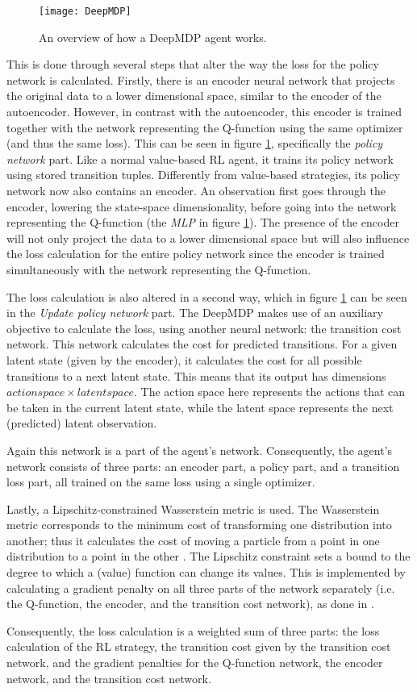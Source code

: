 \begin{figure}[h]
    \centering
    \texttt{[image: DeepMDP]}
    \caption{An overview of how a DeepMDP agent works.}
    \label{fig:deepmdp_agent}
\end{figure}

This is done through several steps that alter the way the loss for the policy network is calculated. Firstly, there is an encoder neural network that projects the original data to a lower dimensional space, similar to the encoder of the autoencoder. However, in contrast with the autoencoder, this encoder is trained together with the network representing the Q-function using the same optimizer (and thus the same loss). This can be seen in figure \ref{fig:deepmdp_agent}, specifically the \textit{policy network} part. Like a normal value-based RL agent, it trains its policy network using stored transition tuples. Differently from value-based strategies, its policy network now also contains an encoder. An observation first goes through the encoder, lowering the state-space dimensionality, before going into the network representing the Q-function (the \textit{MLP} in figure \ref{fig:deepmdp_agent}). The presence of the encoder will not only project the data to a lower dimensional space but will also influence the loss calculation for the entire policy network since the encoder is trained simultaneously with the network representing the Q-function. 

The loss calculation is also altered in a second way, which in figure \ref{fig:deepmdp_agent} can be seen in the \textit{Update policy network} part. The DeepMDP makes use of an auxiliary objective to calculate the loss, using another neural network: the transition cost network. This network calculates the cost for predicted transitions. For a given latent state (given by the encoder), it calculates the cost for all possible transitions to a next latent state. This means that its output has dimensions $action space \times latent space$. The action space here represents the actions that can be taken in the current latent state, while the latent space represents the next (predicted) latent observation.

Again this network is a part of the agent's network. Consequently, the agent's network consists of three parts: an encoder part, a policy part, and a transition loss part, all trained on the same loss using a single optimizer.

Lastly, a Lipschitz-constrained Wasserstein metric is used. The Wasserstein metric corresponds to the minimum cost of transforming one distribution into another; thus it calculates the cost of moving a particle from a point in one distribution to a point in the other \cite{deepmdp}. The Lipschitz constraint sets a bound to the degree to which a (value) function can change its values. This is implemented by calculating a gradient penalty on all three parts of the network separately (i.e. the Q-function, the encoder, and the transition cost network), as done in \cite{wgan}.

Consequently, the loss calculation is a weighted sum of three parts: the loss calculation of the RL strategy, the transition cost given by the transition cost network, and the gradient penalties for the Q-function network, the encoder network, and the transition cost network.
